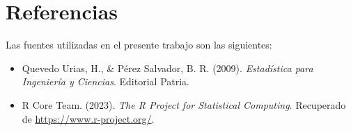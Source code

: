 \documentclass[a4paper,12pt]{article}
\begin{document}
\section{Referencias}

Las fuentes utilizadas en el presente trabajo son las siguientes:

\begin{itemize}
    \item Quevedo Urias, H., \& Pérez Salvador, B. R. (2009). \textit{Estadística para Ingeniería y Ciencias}. Editorial Patria.
    \item R Core Team. (2023). \textit{The R Project for Statistical Computing}. Recuperado de \url{https://www.r-project.org/}.
\end{itemize}

\printbibliography
\end{document}
